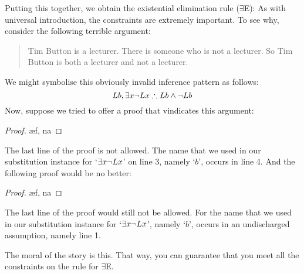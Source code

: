 Putting this together, we obtain the existential elimination rule ($\exists$E):
As with universal introduction, the constraints are extremely important. To see why, consider the following terrible argument:
	\begin{quote}
		Tim Button is a lecturer. There is someone who is not a lecturer. So Tim Button is both a lecturer and not a lecturer.
	\end{quote}
We might symbolise this obviously invalid inference pattern as follows:
$$Lb, \exists x \neg Lx \mathrel{\therefore} Lb \wedge \neg Lb$$
Now, suppose we tried to offer a proof that vindicates this argument:
\begin{proof}
	\open	
		\ae{f, na}
	\close
\end{proof}
The last line of the proof is not allowed. The name that we used in our substitution instance for `$\exists x \neg Lx$' on line 3, namely `$b$', occurs in line 4. And the following proof would be no better:
\begin{proof}
	\open	
		\ae{f, na}
	\close
\end{proof}
The last line of the proof would still not be allowed. For the name that we used in our substitution instance for `$\exists x \neg Lx$', namely `$b$', occurs in an undischarged assumption, namely line 1. 

The moral of the story is this.  That way, you can guarantee that you meet all the constraints on the rule for $\exists$E.

